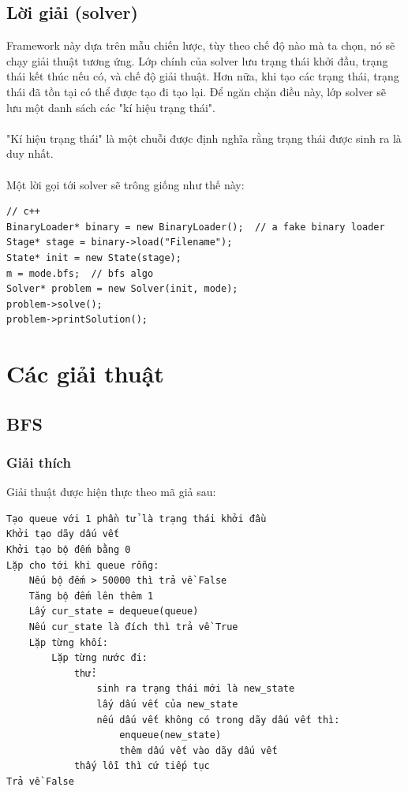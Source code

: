 \documentclass[a4paper, 11pt]{article}
\begin{document}
\subsection{Lời giải (solver)}
Framework này dựa trên mẫu chiến lược, tùy theo chế độ nào mà ta chọn, nó sẽ chạy giải thuật tương ứng.
Lớp chính của solver lưu trạng thái khởi đầu, trạng thái kết thúc nếu có, và chế độ giải thuật. Hơn nữa,
khi tạo các trạng thái, trạng thái đã tồn tại có thể được tạo đi tạo lại. Để ngăn chặn điều này, lớp solver
sẽ lưu một danh sách các "kí hiệu trạng thái".\\~\\
"Kí hiệu trạng thái" là một chuỗi được định nghĩa rằng trạng thái được sinh ra là duy nhất.\\~\\
Một lời gọi tới solver sẽ trông giống như thế này:
\begin{verbatim}
// c++
BinaryLoader* binary = new BinaryLoader();  // a fake binary loader
Stage* stage = binary->load("Filename");
State* init = new State(stage);
m = mode.bfs;  // bfs algo
Solver* problem = new Solver(init, mode);
problem->solve();
problem->printSolution();
\end{verbatim}
\section{Các giải thuật}
\subsection{BFS}
\subsubsection{Giải thích}
Giải thuật được hiện thực theo mã giả sau:
\begin{verbatim}
Tạo queue với 1 phần tử là trạng thái khởi đầu
Khởi tạo dãy dấu vết
Khởi tạo bộ đếm bằng 0
Lặp cho tới khi queue rỗng:
    Nếu bộ đếm > 50000 thì trả về False
    Tăng bộ đếm lên thêm 1
    Lấy cur_state = dequeue(queue)
    Nếu cur_state là đích thì trả về True
    Lặp từng khối:
        Lặp từng nước đi:
            thử:
                sinh ra trạng thái mới là new_state
                lấy dấu vết của new_state
                nếu dấu vết không có trong dãy dấu vết thì:
                    enqueue(new_state)
                    thêm dấu vết vào dãy dấu vết
            thấy lỗi thì cứ tiếp tục
Trả về False
\end{verbatim}
\end{document}
